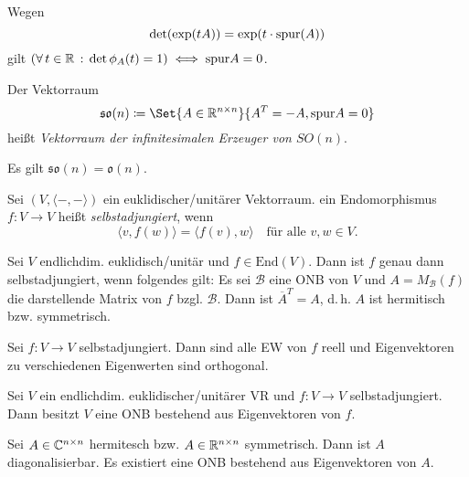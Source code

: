\documentclass{cheat-sheet}
\newcommand{\End}{\mathrm{End}}
\newcommand{\BB}{\mathcal{B}}
\begin{document}
\begin{bem}
Wegen
\[ \det(\exp(tA)) = \exp(t \cdot \mathrm{spur}(A)) \]
gilt $(\forall \, {t \in \mathbb{R}} \,:\, \det \phi_A(t) = 1) \iff \mathrm{spur} A = 0$.
\end{bem}

\begin{definition}
Der Vektorraum
\[ \mathfrak{so}(n) \coloneqq \Set{ A \in \R^{n \times n} }{ A^T = - A, \spur A = 0 } \]
heißt \emph{Vektorraum der infinitesimalen Erzeuger von $SO(n)$}.
\end{definition}

\begin{satz}
Es gilt $\mathfrak{so}(n) = \mathfrak{o}(n)$.
\end{satz}



\begin{definition}
Sei $(V, \langle - , - \rangle)$ ein euklidischer/unitärer Vektorraum. ein Endomorphismus $f : V \to V$ heißt \emph{selbstadjungiert}, wenn
\[ \langle v, f(w) \rangle = \langle f(v), w \rangle \quad \text{für alle $v, w \in V$.} \]
\end{definition}


\begin{satz}
Sei $V$ endlichdim. euklidisch/unitär und $f \in \End(V)$. Dann ist $f$ genau dann selbstadjungiert, wenn folgendes gilt: Es sei $\BB$ eine ONB von $V$ und $A = M_\BB(f)$ die darstellende Matrix von $f$ bzgl. $\BB$. Dann ist $\overline{A}^T = A$, d.\,h. $A$ ist hermitisch bzw. symmetrisch.
\end{satz}

\begin{satz}
Sei $f : V \to V$ selbstadjungiert. Dann sind alle EW von $f$ reell und Eigenvektoren zu verschiedenen Eigenwerten sind orthogonal.
\end{satz}

\begin{satz}
Sei $V$ ein endlichdim. euklidischer/unitärer VR und $f : V \to V$ selbstadjungiert. Dann besitzt $V$ eine ONB bestehend aus Eigenvektoren von $f$.
\end{satz}

\begin{kor}
Sei $A \in \mathbb{C}^{n \times n}$ hermitesch bzw. $A \in \mathbb{R}^{n \times n}$ symmetrisch. Dann ist $A$ diagonalisierbar. Es existiert eine ONB bestehend aus Eigenvektoren von $A$.
\end{kor}
\end{document}
